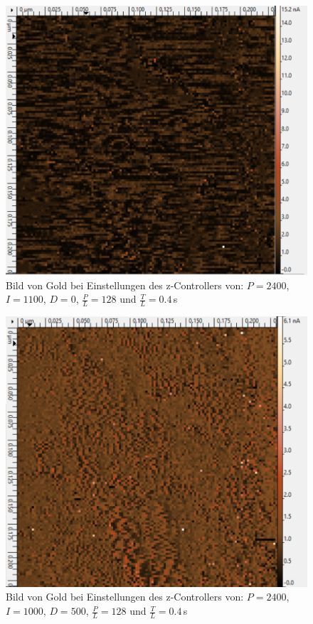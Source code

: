 \begin{figure}[ht]
	\includegraphics[scale=0.5]{Bild/Para/P11}
	\centering
	\caption[Parameter Änderung 11]{Bild von Gold bei Einstellungen des z-Controllers von: $P=2400$, $I=1100$, $D=0$, $\frac{P}{L}=128$ und $\frac{T}{L}=0.4\,$s}
\end{figure}
\begin{figure}[ht]
	\includegraphics[scale=0.5]{Bild/Para/P12}
	\centering
	\caption[Parameter Änderung 12]{Bild von Gold bei Einstellungen des z-Controllers von: $P=2400$, $I=1000$, $D=500$, $\frac{P}{L}=128$ und $\frac{T}{L}=0.4\,$s}
\end{figure}
